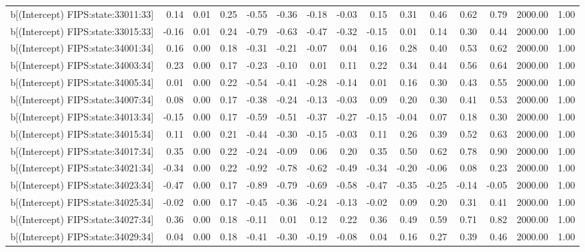 \begin{table}[ht]
\begin{tabular}{rrrrrrrrrrrrrrr}
  b[(Intercept) FIPS:state:33011:33] & 0.14 & 0.01 & 0.25 & -0.55 & -0.36 & -0.18 & -0.03 & 0.15 & 0.31 & 0.46 & 0.62 & 0.79 & 2000.00 & 1.00 \\ 
  b[(Intercept) FIPS:state:33015:33] & -0.16 & 0.01 & 0.24 & -0.79 & -0.63 & -0.47 & -0.32 & -0.15 & 0.01 & 0.14 & 0.30 & 0.44 & 2000.00 & 1.00 \\ 
  b[(Intercept) FIPS:state:34001:34] & 0.16 & 0.00 & 0.18 & -0.31 & -0.21 & -0.07 & 0.04 & 0.16 & 0.28 & 0.40 & 0.53 & 0.62 & 2000.00 & 1.00 \\ 
  b[(Intercept) FIPS:state:34003:34] & 0.23 & 0.00 & 0.17 & -0.23 & -0.10 & 0.01 & 0.11 & 0.22 & 0.34 & 0.44 & 0.56 & 0.64 & 2000.00 & 1.00 \\ 
  b[(Intercept) FIPS:state:34005:34] & 0.01 & 0.00 & 0.22 & -0.54 & -0.41 & -0.28 & -0.14 & 0.01 & 0.16 & 0.30 & 0.43 & 0.55 & 2000.00 & 1.00 \\ 
  b[(Intercept) FIPS:state:34007:34] & 0.08 & 0.00 & 0.17 & -0.38 & -0.24 & -0.13 & -0.03 & 0.09 & 0.20 & 0.30 & 0.41 & 0.53 & 2000.00 & 1.00 \\ 
  b[(Intercept) FIPS:state:34013:34] & -0.15 & 0.00 & 0.17 & -0.59 & -0.51 & -0.37 & -0.27 & -0.15 & -0.04 & 0.07 & 0.18 & 0.30 & 2000.00 & 1.00 \\ 
  b[(Intercept) FIPS:state:34015:34] & 0.11 & 0.00 & 0.21 & -0.44 & -0.30 & -0.15 & -0.03 & 0.11 & 0.26 & 0.39 & 0.52 & 0.63 & 2000.00 & 1.00 \\ 
  b[(Intercept) FIPS:state:34017:34] & 0.35 & 0.00 & 0.22 & -0.24 & -0.09 & 0.06 & 0.20 & 0.35 & 0.50 & 0.62 & 0.78 & 0.90 & 2000.00 & 1.00 \\ 
  b[(Intercept) FIPS:state:34021:34] & -0.34 & 0.00 & 0.22 & -0.92 & -0.78 & -0.62 & -0.49 & -0.34 & -0.20 & -0.06 & 0.08 & 0.23 & 2000.00 & 1.00 \\ 
  b[(Intercept) FIPS:state:34023:34] & -0.47 & 0.00 & 0.17 & -0.89 & -0.79 & -0.69 & -0.58 & -0.47 & -0.35 & -0.25 & -0.14 & -0.05 & 2000.00 & 1.00 \\ 
  b[(Intercept) FIPS:state:34025:34] & -0.02 & 0.00 & 0.17 & -0.45 & -0.36 & -0.24 & -0.13 & -0.02 & 0.09 & 0.20 & 0.31 & 0.41 & 2000.00 & 1.00 \\ 
  b[(Intercept) FIPS:state:34027:34] & 0.36 & 0.00 & 0.18 & -0.11 & 0.01 & 0.12 & 0.22 & 0.36 & 0.49 & 0.59 & 0.71 & 0.82 & 2000.00 & 1.00 \\ 
  b[(Intercept) FIPS:state:34029:34] & 0.04 & 0.00 & 0.18 & -0.41 & -0.30 & -0.19 & -0.08 & 0.04 & 0.16 & 0.27 & 0.39 & 0.46 & 2000.00 & 1.00 \\ 

\end{tabular}
\end{table}
